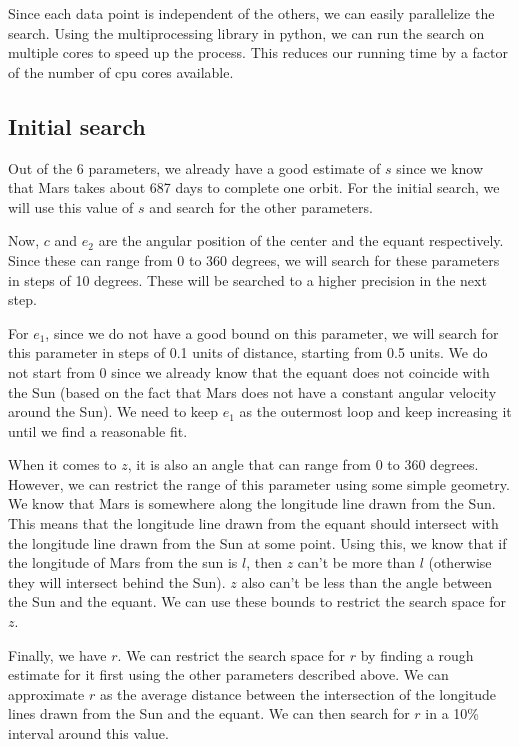 \documentclass[12pt]{article}
\begin{document}
Since each data point is independent of the others, we can easily parallelize the search. Using the multiprocessing library in python, we can run the search on multiple cores to speed up the process. This reduces our running time by a factor of the number of cpu cores available.

\subsection*{Initial search}
Out of the 6 parameters, we already have a good estimate of $s$ since we know that Mars takes about 687 days to complete one orbit. For the initial search, we will use this value of $s$ and search for the other parameters. 

Now, $c$ and $e_2$ are the angular position of the center and the equant respectively. Since these can range from 0 to 360 degrees, we will search for these parameters in steps of 10 degrees. These will be searched to a higher precision in the next step.

For $e_1$, since we do not have a good bound on this parameter, we will search for this parameter in steps of 0.1 units of distance, starting from 0.5 units. We do not start from 0 since we already know that the equant does not coincide with the Sun (based on the fact that Mars does not have a constant angular velocity around the Sun). We need to keep $e_1$ as the outermost loop and keep increasing it until we find a reasonable fit.

When it comes to $z$, it is also an angle that can range from 0 to 360 degrees. However, we can restrict the range of this parameter using some simple geometry. We know that Mars is somewhere along the longitude line drawn from the Sun. This means that the longitude line drawn from the equant should intersect with the longitude line drawn from the Sun at some point. Using this, we know that if the longitude of Mars from the sun is $l$, then $z$ can't be more than $l$ (otherwise they will intersect behind the Sun). $z$ also can't be less than the angle between the Sun and the equant. We can use these bounds to restrict the search space for $z$.

Finally, we have $r$. We can restrict the search space for $r$ by finding a rough estimate for it first using the other parameters described above. We can approximate $r$ as the average distance between the intersection of the longitude lines drawn from the Sun and the equant. We can then search for $r$ in a 10\% interval around this value.
\end{document}
